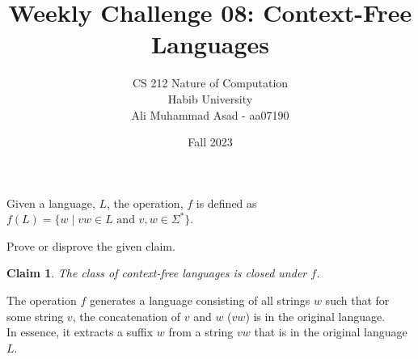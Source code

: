 \documentclass[a4paper]{exam}
\title{Weekly Challenge 08: Context-Free Languages}
\author{CS 212 Nature of Computation\\Habib University\\Ali Muhammad Asad - aa07190}
\date{Fall 2023}
\newtheorem{claim}{Claim}
\begin{document}
\maketitle

\begin{questions}


  Given a language, $L$, the operation, $f$ is defined as $f(L) = \{w\mid vw \in L \text{ and } v,w\in\Sigma^*\}$.

  Prove or disprove the given claim.

  \begin{claim}
    The class of context-free languages is closed under $f$.
  \end{claim}

  \begin{solution}

    The operation $f$ generates a language consisting of all strings $w$ such that for some string $v$, the concatenation of $v$ and $w$ ($vw$) is in the original language. \\ In essence, it extracts a suffix $w$ from a string $vw$ that is in the original language $L$.




\end{solution}
\end{questions}
\end{document}
